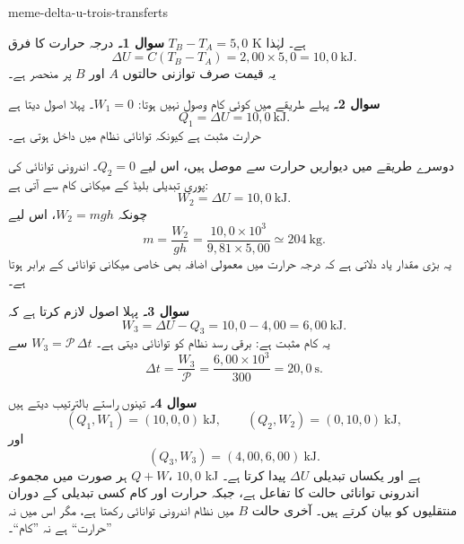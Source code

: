 \begin{exo}{meme-delta-u-trois-transferts}
\begin{solution}
\textbf{سوال 1۔} درجہ حرارت کا فرق $T_B-T_A=5{,}0$ K ہے۔ لہٰذا
\[
\Delta U=C(T_B-T_A)
=2{,}00\times5{,}0
=10{,}0\ \mathrm{kJ}.
\]
یہ قیمت صرف توازنی حالتوں $A$ اور $B$ پر منحصر ہے۔

\textbf{سوال 2۔} پہلے طریقے میں کوئی کام وصول نہیں ہوتا: $W_1=0$۔ پہلا اصول دیتا ہے
\[
Q_1=\Delta U=10{,}0\ \mathrm{kJ}.
\]
حرارت مثبت ہے کیونکہ توانائی نظام میں داخل ہوتی ہے۔

دوسرے طریقے میں دیواریں حرارت سے موصل ہیں، اس لیے $Q_2=0$۔ اندرونی توانائی
کی پوری تبدیلی بلیڈ کے میکانی کام سے آتی ہے:
\[
W_2=\Delta U=10{,}0\ \mathrm{kJ}.
\]
چونکہ $W_2=mgh$، اس لیے
\[
m=\frac{W_2}{gh}
=\frac{10{,}0\times10^3}{9{,}81\times5{,}00}
\simeq 204\ \mathrm{kg}.
\]
یہ بڑی مقدار یاد دلاتی ہے کہ درجہ حرارت میں معمولی اضافہ بھی خاصی میکانی
توانائی کے برابر ہوتا ہے۔

\textbf{سوال 3۔} پہلا اصول لازم کرتا ہے کہ
\[
W_3=\Delta U-Q_3=10{,}0-4{,}00=6{,}00\ \mathrm{kJ}.
\]
یہ کام مثبت ہے: برقی رسد نظام کو توانائی دیتی ہے۔ $W_3=\mathcal P\,\Delta t$ سے
\[
\Delta t=\frac{W_3}{\mathcal P}
=\frac{6{,}00\times10^3}{300}
=20{,}0\ \mathrm{s}.
\]

\textbf{سوال 4۔} تینوں راستے بالترتیب دیتے ہیں
\[
(Q_1,W_1)=(10{,}0,0)\ \mathrm{kJ},
\qquad
(Q_2,W_2)=(0,10{,}0)\ \mathrm{kJ},
\]
اور
\[
(Q_3,W_3)=(4{,}00,6{,}00)\ \mathrm{kJ}.
\]
ہر صورت میں مجموعہ $Q+W$، $10{,}0$ kJ ہے اور یکساں تبدیلی $\Delta U$ پیدا
کرتا ہے۔ اندرونی توانائی حالت کا تفاعل ہے، جبکہ حرارت اور کام کسی تبدیلی کے
دوران منتقلیوں کو بیان کرتے ہیں۔ آخری حالت $B$ میں نظام اندرونی توانائی رکھتا
ہے، مگر اس میں نہ ”حرارت“ ہے نہ ”کام“۔
\end{solution}
\end{exo}

